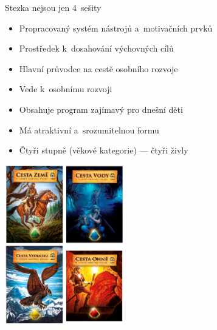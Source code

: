 \documentclass[hyperref={bookmarks=true, unicode=true, colorlinks=true, plainpages=false, pdfkeywords={Skaut, Junak, Skauting, Vychovna metoda}, linkcolor=OrangeRed, anchorcolor=OrangeRed, citecolor=RawSienna, filecolor=RawSienna, menucolor=OrangeRed, urlcolor=RawSienna, pdftex}, compress, xelatex, xcolor=dvipsnames, print]{beamer}
\begin{document}
\begin{frame}{Stezka nejsou jen 4~sešity}
\begin{multicols}{2}
\begin{itemize}
\item Propracovaný systém nástrojů a~motivačních prvků
\item Prostředek k~dosahování výchovných cílů
\item Hlavní průvodce na cestě osobního rozvoje
\item Vede k~osobnímu rozvoji
\item Obsahuje program zajímavý pro dnešní děti
\item Má atraktivní a~srozumitelnou formu
\item Čtyři stupně (věkové kategorie) --- čtyři živly
\end{itemize}
\columnbreak
\includegraphics[height=7cm]{stezky.png}
\end{multicols}
\end{frame}
\end{document}
